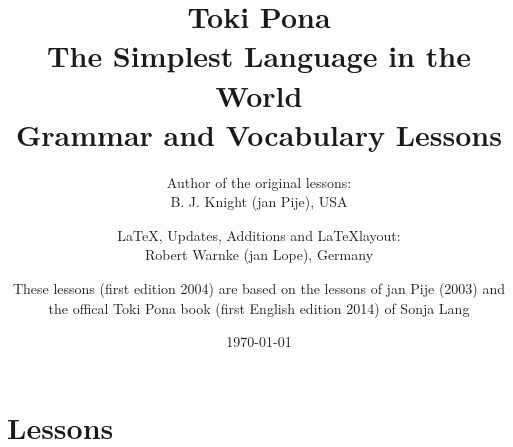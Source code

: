 \documentclass[a4paper, 10pt]{book}
\begin{document}
\setlength{\topmargin}{-19mm}
\setlength{\headheight}{5mm}
\setlength{\headsep}{10mm}
\setlength{\textheight}{245mm}
\setlength{\textwidth}{155mm}
\setlength{\oddsidemargin}{5mm}
\setlength{\evensidemargin}{-1mm}
\setlength{\footskip}{20mm}
\setlength{\parindent}{0mm}
\setlength{\parskip}{2.0ex plus 1.0ex minus 0.5ex}

\title{
    Toki Pona \\
    The Simplest Language in the World \\
    Grammar and Vocabulary Lessons \\
}
\author{
    Author of the original lessons: \\ B. J. Knight (jan Pije), USA \cite{www:Pije:01} \\
    \and
    \LaTeX, Updates, Additions and \LaTeX layout: \\ Robert Warnke (jan Lope), Germany \cite{www:rowa:01} \\
    \and
    These lessons (first edition 2004) are based on the lessons of jan Pije (2003) and \\
    the offical Toki Pona book (first English edition 2014) of Sonja Lang \cite{www:tokipona.org}
}

%
\date
\today
\maketitle
\tableofcontents

\chapter{Lessons}




















%


%
\appendix
\end{document}
